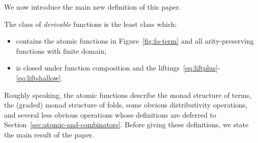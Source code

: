 We now introduce the main new definition of this paper.

\begin{definition}
    The class of \emph{derivable} functions is the least class which:
    \begin{itemize}
        \item contains the atomic functions in Figure~\ref{fig:fo-term} and all arity-preserving functions with finite domain;
        \item is closed under  function composition and the liftings~\eqref{eq:liftplus}-\eqref{eq:liftshallow}.
    \end{itemize}
\end{definition}



Roughly speaking, the atomic functions describe the monad structure of terms, the (graded) monad structure of folds, some obvious distributivity operations, and several less obvious operations whose definitions are  deferred to Section~\ref{sec:atomic-and-combinators}. Before giving these definitions, we state the main result of the paper. 


